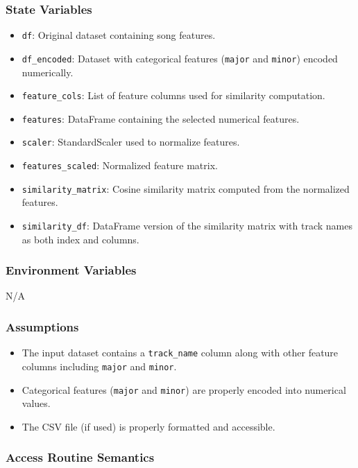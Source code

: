 \documentclass[12pt, titlepage]{article}
\begin{document}
{\subsubsection{State Variables}
\begin{itemize}
    \item \texttt{df}: Original dataset containing song features.
    \item \texttt{df\_encoded}: Dataset with categorical features (\texttt{major} and \texttt{minor}) encoded numerically.
    \item \texttt{feature\_cols}: List of feature columns used for similarity computation.
    \item \texttt{features}: DataFrame containing the selected numerical features.
    \item \texttt{scaler}: StandardScaler used to normalize features.
    \item \texttt{features\_scaled}: Normalized feature matrix.
    \item \texttt{similarity\_matrix}: Cosine similarity matrix computed from the normalized features.
    \item \texttt{similarity\_df}: DataFrame version of the similarity matrix with track names as both index and columns.
\end{itemize}

\subsubsection{Environment Variables}
N/A

\subsubsection{Assumptions}
\begin{itemize}
    \item The input dataset contains a \texttt{track\_name} column along with other feature columns including \texttt{major} and \texttt{minor}.
    \item Categorical features (\texttt{major} and \texttt{minor}) are properly encoded into numerical values.
    \item The CSV file (if used) is properly formatted and accessible.
\end{itemize}

\subsubsection{Access Routine Semantics}

}
\end{document}
